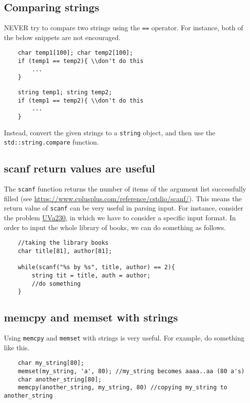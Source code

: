 \documentclass[12pt,a4paper]{amsart}
\numberwithin{equation}{section}
\theoremstyle{definition}
\begin{document}
\subsection{Comparing strings} NEVER try to compare two strings using the \verb|==| operator. For instance, both of the below snippets are not encouraged. 
\begin{lstlisting}
    char temp1[100]; char temp2[100];
    if (temp1 == temp2){ \\don't do this
        ...
    }
\end{lstlisting}

\begin{lstlisting}
    string temp1; string temp2;
    if (temp1 == temp2){ \\don't do this
        ...
    }
\end{lstlisting}
Instead, convert the given strings to a \verb|string| object, and then use the \verb|std::string.compare| function. 

\subsection{scanf return values are useful} The \verb|scanf| function returns the number of items of the argument list successfully filled (see \url{https://www.cplusplus.com/reference/cstdio/scanf/}). This means the return value of \verb|scanf| can be very useful in parsing input. For instance, consider the problem \href{https://onlinejudge.org/index.php?option=com_onlinejudge&Itemid=8&category=623&page=show_problem&problem=166}{UVa230}, in which we have to consider a specific input format. In order to input the whole library of books, we can do something as follows.
\begin{lstlisting}
    //taking the library books
    char title[81], author[81];
        
    while(scanf("%s by %s", title, author) == 2){
        string tit = title, auth = author;
        //do something
    }
\end{lstlisting}

\subsection{memcpy and memset with strings} Using \verb|memcpy| and \verb|memset| with strings is very useful. For example, do something like this. 
\begin{lstlisting}
    char my_string[80];
    memset(my_string, 'a', 80); //my_string becomes aaaa..aa (80 a's)
    char another_string[80];
    memcpy(another_string, my_string, 80) //copying my_string to another_string
\end{lstlisting}
\end{document}
